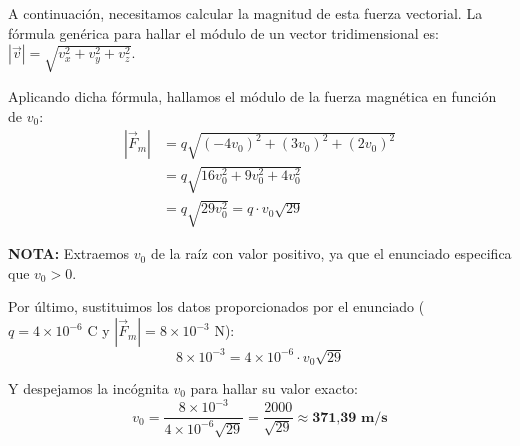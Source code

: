 \documentclass[11pt, a4paper]{article}
\newenvironment{problem}[1][Cuestión]{
	\vspace{0.5cm}
	\noindent{\Large\bfseries #1} \par\vspace{0.5cm}
}{
	\vspace{0.5cm}
}
\begin{document}
\begin{problem}[Cuestión 1]
{			A continuación, necesitamos calcular la magnitud de esta fuerza vectorial. La fórmula genérica para hallar el módulo de un vector tridimensional es: $|\vec{v}| = \sqrt{v_x^2 + v_y^2 + v_z^2}$. 

			Aplicando dicha fórmula, hallamos el módulo de la fuerza magnética en función de $v_0$:
			\begin{align*}
				|\vec{F}_m| &= q \sqrt{(-4v_0)^2 + (3v_0)^2 + (2v_0)^2} \\
				&= q \sqrt{16v_0^2 + 9v_0^2 + 4v_0^2} \\
				&= q \sqrt{29v_0^2} = q \cdot v_0 \sqrt{29}
			\end{align*}

			\textbf{NOTA:} Extraemos $v_0$ de la raíz con valor positivo, ya que el enunciado especifica que $v_0 > 0$.

			Por último, sustituimos los datos proporcionados por el enunciado ($q = 4 \times 10^{-6} \text{ C}$ y $|\vec{F}_m| = 8 \times 10^{-3} \text{ N}$):
			\begin{equation*}
				8 \times 10^{-3} = 4 \times 10^{-6} \cdot v_0 \sqrt{29}
			\end{equation*}

			Y despejamos la incógnita $v_0$ para hallar su valor exacto:
			\begin{equation*}
				\boxed{v_0 = \frac{8 \times 10^{-3}}{4 \times 10^{-6} \sqrt{29}} = \frac{2000}{\sqrt{29}} \approx \textbf{371,39 m/s}}
			\end{equation*}
		}
	\end{problem}
\end{document}
